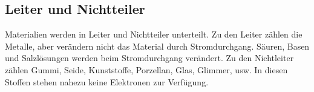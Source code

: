 \subsection{Leiter und Nichtteiler}
Materialien werden in Leiter und Nichtteiler unterteilt. Zu den Leiter zählen die Metalle, aber verändern nicht das Material durch Stromdurchgang. Säuren, Basen und Salzlösungen werden beim Stromdurchgang verändert.
\newline\newline
Zu den Nichtleiter zählen Gummi, Seide, Kunststoffe, Porzellan, Glas, Glimmer, usw. In diesen Stoffen stehen nahezu keine Elektronen zur Verfügung.



